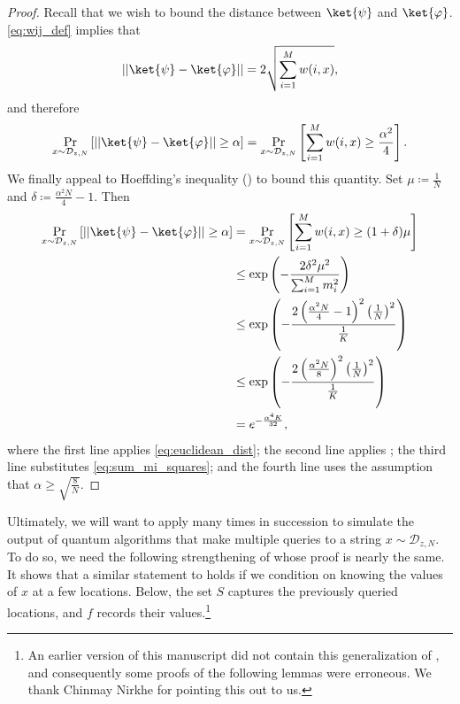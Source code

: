 \documentclass[11pt]{article}%
\begin{document}
\begin{proof}
Recall that we wish to bound the distance between $\ket{\psi}$ and $\ket{\varphi}$. \eqref{eq:wij_def} implies that
\begin{equation}
|| \ket{\psi} - \ket{\varphi}|| = 2\sqrt{\sum_{i=1}^M w(i,x)},
\label{eq:euclidean_dist}
\end{equation}
and therefore
\[
\Pr_{x \sim \mathcal{D}_{z,N}} \left[|| \ket{\psi} - \ket{\varphi}|| \ge \alpha \right]
= \Pr_{x \sim \mathcal{D}_{z,N}} \left[\sum_{i=1}^M w(i,x) \ge \frac{\alpha^2}{4} \right].
\]
We finally appeal to Hoeffding's inequality () to bound this quantity. Set $\mu \coloneqq \frac{1}{N}$ and $\delta \coloneqq \frac{\alpha^2 N}{4} - 1$. Then
\begin{align*}
\Pr_{x \sim \mathcal{D}_{z,N}} \left[|| \ket{\psi} - \ket{\varphi}|| \ge \alpha \right]
&= \Pr_{x \sim \mathcal{D}_{z,N}} \left[\sum_{i=1}^M w(i,x) \ge (1 + \delta)\mu \right]\\
&\le \exp\left(-\frac{2\delta^2 \mu^2}{\sum_{i=1}^M m_i^2} \right)\\
&\le \exp\left(-\frac{2\left(\frac{\alpha^2N}{4} - 1\right)^2 \left(\frac{1}{N}\right)^2}{\frac{1}{K}} \right)\\
&\le \exp\left(-\frac{2\left(\frac{\alpha^2N}{8}\right)^2 \left(\frac{1}{N}\right)^2}{\frac{1}{K}} \right)\\
&= e^{-\frac{\alpha^4 K}{32}},
\end{align*}
where the first line applies \eqref{eq:euclidean_dist}; the second line applies ; the third line substitutes \eqref{eq:sum_mi_squares}; and the fourth line uses the assumption that $\alpha \ge \sqrt{\frac{8}{N}}$.
\end{proof}

Ultimately, we will want to apply  many times in succession to simulate the output of quantum algorithms that make multiple queries to a string $x \sim \mathcal{D}_{z, N}$. To do so, we need the following strengthening of  whose proof is nearly the same. It shows that a similar statement to  holds if we condition on knowing the values of $x$ at a few locations. Below, the set $S$ captures the previously queried locations, and $f$ records their values.\footnote{An earlier version of this manuscript did not contain this generalization of , and consequently some proofs of the following lemmas were erroneous. We thank Chinmay Nirkhe for pointing this out to us.}
\end{document}
